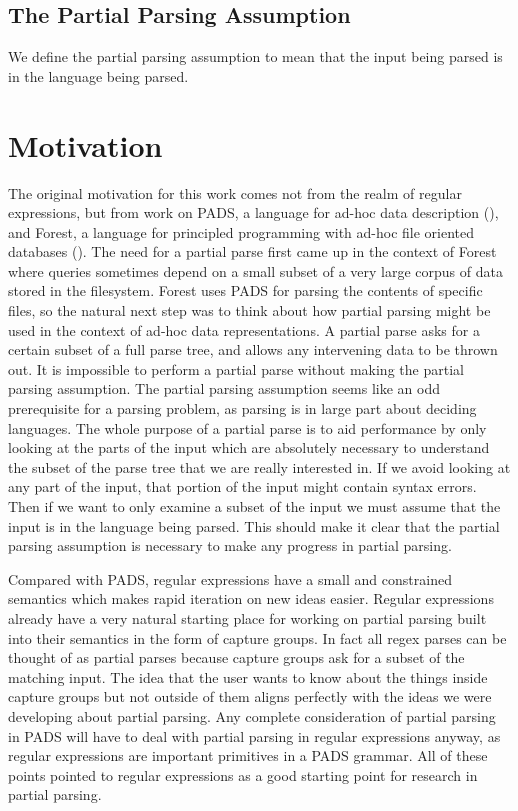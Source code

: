 \subsection{The Partial Parsing Assumption}

We define the partial parsing assumption to mean that the
input being parsed is in the language being parsed.

\section{Motivation}

The original motivation for this work comes not from the realm of
regular expressions, but from work on PADS, a language for ad-hoc
data description (\cite{Fisher2005}), and Forest, a language for
principled programming with ad-hoc file oriented databases
(\cite{Fisher2011}). The need for a partial parse first
came up in the context of Forest where queries sometimes depend on
a small subset of a very large corpus of data stored in the filesystem.
Forest uses PADS for parsing the contents of specific files, so the
natural next step was to think about how partial parsing might
be used in the context of ad-hoc data representations.
A partial parse asks for a certain subset of a full parse tree,
and allows any intervening data to be thrown out. It is impossible
to perform a partial parse without making the partial parsing assumption.
The partial parsing assumption seems like an odd prerequisite for
a parsing problem, as parsing is in large part about deciding
languages. The whole purpose of a partial parse
is to aid performance by only looking at the parts of the input which
are absolutely necessary to understand the subset of the parse tree
that we are really interested in. If we avoid looking at any part of
the input, that portion of the input might contain syntax errors.
Then if we want to only examine a subset of the input we must assume
that the input is in the language being parsed. This should make it
clear that the partial parsing assumption is necessary to make
any progress in partial parsing.

Compared with PADS, regular expressions have a small and
constrained semantics which makes rapid iteration on new
ideas easier. Regular expressions already have a very natural
starting place for working on partial parsing built into their
semantics in the form of capture groups. In fact all regex parses
can be thought of as partial parses because capture groups ask for
a subset of the matching input. The idea that the user wants
to know about the things inside capture groups but not outside of
them aligns perfectly with the ideas we were developing about
partial parsing. Any complete consideration of partial
parsing in PADS will have to deal with partial parsing in regular
expressions anyway, as regular expressions are important primitives in
a PADS grammar. All of these points pointed to regular expressions as a good
starting point for research in partial parsing.

